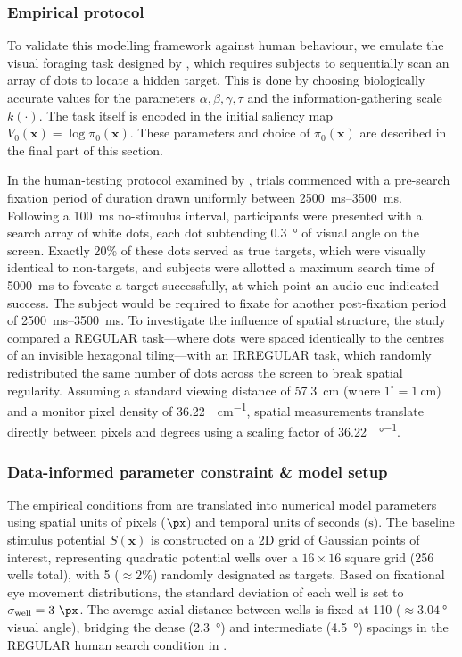 \subsubsection*{Empirical protocol}
To validate this modelling framework against human behaviour, we emulate the visual foraging task designed by \textcite{naher_primate_saccades}, which requires subjects to sequentially scan an array of dots to locate a hidden target. This is done by choosing biologically accurate values for the parameters $\alpha,\beta,\gamma,\tau$ and the information-gathering scale $k(\cdot)$. The task itself is encoded in the initial saliency map $V_0(\textbf{x}) = \log \pi_0(\textbf{x})$. These parameters and choice of $\pi_0(\textbf{x})$ are described in the final part of this section.

In the human-testing protocol examined by \textcite{naher_primate_saccades}, trials commenced with a pre-search fixation period of duration drawn uniformly between \SIrange{2500}{3500}{\milli \second}. Following a \qty{100}{\milli \second} no-stimulus interval, participants were presented with a search array of white dots, each dot subtending \qty{0.3}{\degree} of visual angle on the screen. Exactly 20\% of these dots served as true targets, which were visually identical to non-targets, and subjects were allotted a maximum search time of 5000~ms to foveate a target successfully, at which point an audio cue indicated success. The subject would be required to fixate for another post-fixation period of \SIrange{2500}{3500}{\milli \second}. To investigate the influence of spatial structure, the study compared a REGULAR task---where dots were spaced identically to the centres of an invisible hexagonal tiling---with an IRREGULAR task, which randomly redistributed the same number of dots across the screen to break spatial regularity. Assuming a standard viewing distance of \qty{57.3}{\cm} (where $1^{\circ} = 1~\unit{\cm}$) and a monitor pixel density of \qty{36.22}{\px\per\cm}, spatial measurements translate directly between pixels and degrees using a scaling factor of \qty{36.22}{\px\per\degree}.

\subsubsection*{Data-informed parameter constraint \& model setup}
The empirical conditions from \textcite{naher_primate_saccades} are translated into numerical model parameters using spatial units of pixels ($\unit{\px}$) and temporal units of seconds ($\unit{\second}$). The baseline stimulus potential $S(\mathbf{x})$ is constructed on a 2D grid of Gaussian points of interest, representing quadratic potential wells over a $16 \times 16$ square grid (256 wells total), with 5 ($\approx 2\%$) randomly designated as targets. Based on fixational eye movement distributions, the standard deviation of each well is set to $\sigma_{\text{well}} = 3~\unit{\px}$. The average axial distance between wells is fixed at \qty{110}{\px} ($\approx \qty{3.04}{\degree}$ visual angle), bridging the dense (\qty{2.3}{\degree}) and intermediate (\qty{4.5}{\degree}) spacings in the REGULAR human search condition in \textcite{naher_primate_saccades}.

